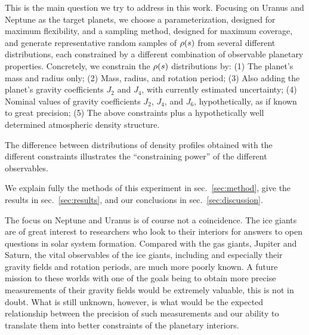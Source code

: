 This is the main question we try to address in this work. Focusing on Uranus and
Neptune as the target planets, we choose a parameterization, designed for
maximum flexibility, and a sampling method, designed for maximum coverage, and
generate representative random samples of $\rho(s)$ from several different
distributions, each constrained by a different combination of observable
planetary properties. Concretely, we constrain the $\rho(s)$ distributions by:
(1) The planet's mass and radius only; (2) Mass, radius, and rotation period;
(3) Also adding the planet's gravity coefficients $J_2$ and $J_4$, with
currently estimated uncertainty; (4) Nominal values of gravity coefficients
$J_2$, $J_4$, and $J_6$, hypothetically, as if known to great precision; (5) The
above constraints plus a hypothetically well determined atmospheric density
structure.

The difference between distributions of density profiles obtained with the
different constraints illustrates the ``constraining power'' of the different
observables.

We explain fully the methods of this experiment in sec.~\ref{sec:method}, give
the results in sec.~\ref{sec:results}, and our conclusions in
sec.~\ref{sec:discussion}.

The focus on Neptune and Uranus is of course not a coincidence. The ice giants
are of great interest to researchers who look to their interiors for answers to
open questions in solar system formation. Compared with the gas giants, Jupiter
and Saturn, the vital observables of the ice giants, including and especially
their gravity fields and rotation periods, are much more poorly known. A future
mission to these worlds with one of the goals being to obtain more precise
measurements of their gravity fields would be extremely valuable, this is not in
doubt. What is still unknown, however, is what would be the expected
relationship between the precision of such measurements and our ability to
translate them into better constraints of the planetary interiors.